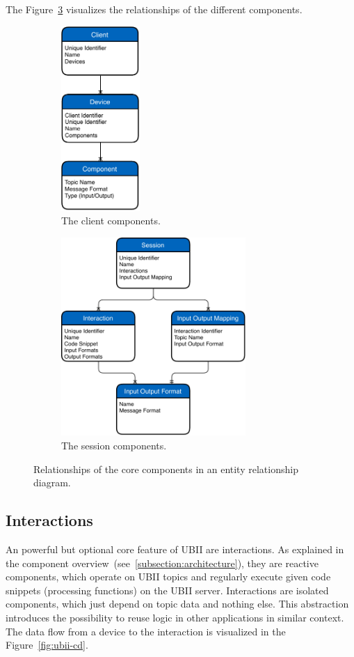 The Figure~\ref{fig:ubii-er} visualizes the relationships of the different components.

\begin{figure}[htpb]
  \centering
  \begin{subfigure}{.5\textwidth}
    \centering
    \includegraphics[width=3cm]{figures/ubii_er_client.pdf}
    \caption{The client components.}\label{fig:ubii-er-client}
  \end{subfigure}%
  \begin{subfigure}{.5\textwidth}
    \centering
    \includegraphics[width=7cm]{figures/ubii_er_server.pdf}
    \caption{The session components.}\label{fig:ubii-er-server}
  \end{subfigure}
  \caption[UBII components diagram]{Relationships of the core components in an entity relationship diagram.}\label{fig:ubii-er}
\end{figure}


\subsection{Interactions}\label{subsection:interactions}
An powerful but optional core feature of \ac{UBII} are interactions. As explained in the component overview~(see~\ref{subsection:architecture}), they are reactive components, which operate on \ac{UBII} topics and regularly execute given code snippets (processing functions) on the \ac{UBII} server. Interactions are isolated components, which just depend on topic data and nothing else. This abstraction introduces the possibility to reuse logic in other applications in similar context. The data flow from a device to the interaction is visualized in the Figure~\ref{fig:ubii-cd}.

